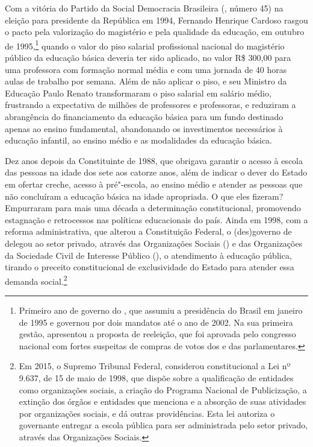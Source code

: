 Com a vitória do Partido da Social Democracia Brasileira (, número
45) na eleição para presidente da República em 1994, Fernando Henrique
Cardoso rasgou o pacto pela valorização do magistério e pela qualidade
da educação, em outubro de 1995,\footnote{Primeiro ano de governo do ,
  que assumiu a presidência do Brasil em janeiro de 1995 e governou por
  dois mandatos até o ano de 2002. Na sua primeira gestão, apresentou a
  proposta de reeleição, que foi aprovada pelo congresso nacional com
  fortes suspeitas de compras de votos dos e das parlamentares.} quando
o valor do piso salarial profissional nacional do magistério público da
educação básica deveria ter sido aplicado, no valor R\$ 300,00 para uma
professora com formação normal média e com uma jornada de 40 horas aulas
de trabalho por semana. Além de não aplicar o piso,  e seu Ministro
da Educação Paulo Renato transformaram o piso salarial em salário médio,
frustrando a expectativa de milhões de professores e professoras, e
reduziram a abrangência do financiamento da educação básica para um fundo
destinado apenas ao ensino fundamental, abandonando os investimentos
necessários à educação infantil, ao ensino médio e as modalidades da
educação básica.

Dez anos depois da Constituinte de 1988, que obrigava garantir o acesso
à escola das pessoas na idade dos sete aos catorze anos, além de
indicar o dever do Estado em ofertar creche, acesso à pré"-escola, ao
ensino médio e atender as pessoas que não concluíram a educação básica
na idade apropriada. O que eles fizeram? Empurraram para mais uma década
a determinação constitucional, promovendo estagnação e retrocessos nas
políticas educacionais do país. Ainda em 1998, com a reforma
administrativa, que alterou a Constituição Federal, o (des)governo de
 delegou ao setor privado, através das Organizações Sociais () e
das Organizações da Sociedade Civil de Interesse Público (), o
atendimento à educação pública, tirando o preceito constitucional de
exclusividade do Estado para atender essa demanda social.\footnote{Em
  2015, o Supremo Tribunal Federal, considerou constitucional a
  Lei nº 9.637, de 15 de maio de 1998, que dispõe sobre a
  qualificação de entidades como organizações sociais, a criação do
  Programa Nacional de Publicização, a extinção dos órgãos e entidades
  que menciona e a absorção de suas atividades por organizações sociais,
  e dá outras providências. Esta lei autoriza o governante entregar a
  escola pública para ser administrada pelo setor privado, através das
  Organizações Sociais.}


